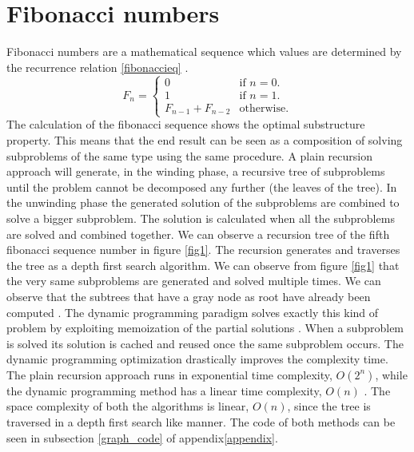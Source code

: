 \documentclass[runningheads]{llncs}
\begin{document}
\section{Fibonacci numbers}
Fibonacci numbers are a mathematical sequence which values are
determined by the recurrence relation \ref{fibonaccieq}
\cite{fib_num}.
\begin{equation}\label{fibonaccieq}
  F_n=\begin{cases}
  0 & \text{if $n=0$}.\\
  1 & \text{if $n=1$}.\\
  F_{n-1} + F_{n-2} & \text{otherwise}.
  \end{cases}
\end{equation}
The calculation of the fibonacci sequence shows the optimal
substructure property. This means that the end result can be seen as a
composition of solving subproblems of the same type using the same
procedure. A plain recursion approach will generate, in the winding
phase, a recursive tree of subproblems until the problem cannot be
decomposed any further (the leaves of the tree). In the unwinding
phase the generated solution of the subproblems are combined to solve
a bigger subproblem. The solution is calculated when all the
subproblems are solved and combined together. We can observe a
recursion tree of the fifth fibonacci sequence number in figure \ref{fig1}.
The recursion generates and traverses the tree as a depth first search
algorithm. We can observe from figure \ref{fig1} that the very same
subproblems are generated and solved multiple times. We can observe
that the subtrees that have a gray node as root have already been
computed \cite{fibo}. The dynamic programming paradigm solves exactly
this kind of problem by exploiting memoization of the partial
solutions \cite{dprogramming}. When a subproblem is solved its
solution is cached and reused once the same subproblem occurs. The
dynamic programming optimization drastically improves the complexity
time. The plain recursion approach runs in exponential time complexity,
$O(2^n)$, while the dynamic programming method has a linear time
complexity, $O(n)$ \cite{fibo}. The space complexity of both the algorithms is
linear, $O(n)$, since the tree is traversed in a depth first search
like manner. The code of both methods can be seen in subsection
\ref{graph_code} of appendix\ref{appendix}.
\end{document}
